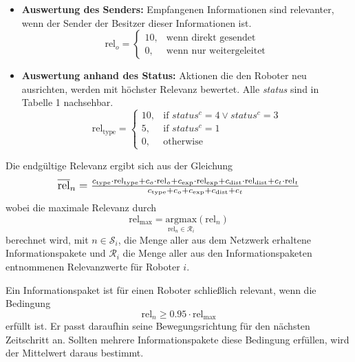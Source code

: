 \documentclass[conference]{IEEEtran}
\begin{document}
\begin{itemize}
    \item \textbf{Auswertung des Senders:}
    Empfangenen Informationen sind relevanter, wenn der Sender der Besitzer dieser Informationen ist.
    \begin{equation}
    \mathrm{rel}_o =
    \begin{cases}
    10, & \text{wenn direkt gesendet}\\
    0, & \text{wenn nur weitergeleitet}
    \end{cases}
    \end{equation}
    
    \item \textbf{Auswertung anhand des Status:}
    Aktionen die den Roboter neu ausrichten, werden mit höchster Relevanz bewertet. Alle \textit{status} sind in Tabelle 1
    nachsehbar.
    \begin{equation}
    \mathrm{rel}_{\mathrm{type}} =
    \begin{cases}
    10, & \text{if } status^c = 4 \vee status^c = 3 \\
    5,  & \text{if } status^c = 1 \\
    0,  & \text{otherwise}
    \end{cases}
    \end{equation}
\end{itemize}

Die endgültige Relevanz ergibt sich aus der Gleichung
\begin{equation}
\scalebox{1.15}{$\overline{\mathrm{rel}}_n = \frac{c_{\mathrm{type}} \cdot \mathrm{rel}_{\mathrm{type}} + c_o \cdot \mathrm{rel}_o + c_{\mathrm{exp}} \cdot \mathrm{rel}_{\mathrm{exp}} + c_{\mathrm{dist}} \cdot \mathrm{rel}_{\mathrm{dist}} + c_t \cdot \mathrm{rel}_t}{c_{\mathrm{type}} + c_o + c_{\mathrm{exp}} + c_{\mathrm{dist}} + c_t}$}
\end{equation}
wobei die maximale Relevanz durch 
\begin{equation}
\mathrm{rel}_{\mathrm{max}} = \underset{\mathrm{rel}_n \in \mathcal{R}_i}{\mathrm{argmax}}(\mathrm{rel}_n)
\end{equation}
berechnet wird, mit $n \in \mathcal{S}_i$, die Menge aller aus dem Netzwerk erhaltene Informationspakete und 
$\mathcal{R}_i$ die Menge aller aus den Informationspaketen entnommenen Relevanzwerte für Roboter $i$.

Ein Informationspaket ist für einen Roboter schließlich relevant, wenn die Bedingung
\begin{equation}
\mathrm{rel}_n \geq 0.95 \cdot \mathrm{rel}_{\mathrm{max}}
\end{equation}
erfüllt ist. Er passt daraufhin seine 
Bewegungsrichtung für den nächsten Zeitschritt an. Sollten mehrere Informationspakete 
diese Bedingung erfüllen, wird der Mittelwert daraus bestimmt.
\end{document}
